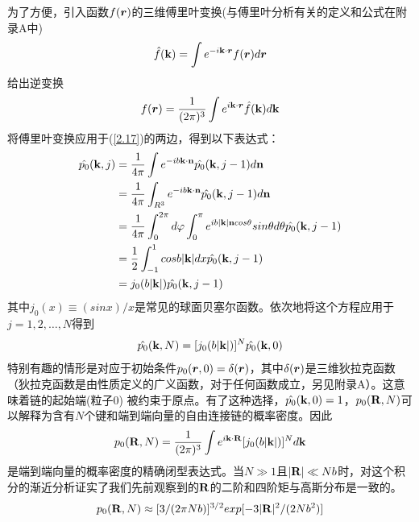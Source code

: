 为了方便，引入函数$f(\bm{r})$的三维傅里叶变换(与傅里叶分析有关的定义和公式在附录A中)\\
\begin{gather}
\hat{f}(\mathbf{k})=\int e^{-i\mathbf{k} \cdot \bm{r}}f(\bm{r})d\bm{r}
\label{2.18}
\end{gather}
给出逆变换\\
\begin{gather}
 f(\bm{r})=\frac{1}{(2 \pi)^3} \int e^{i\mathbf{k} \cdot \bm{r}} \hat{f}(\mathbf{k})d\mathbf{k}
\label{2.19}
\end{gather}
将傅里叶变换应用于(\ref{2.17})的两边，得到以下表达式：\\
\begin{gather}
\begin{aligned}
\hat{p_0}(\mathbf{k},j)&=\frac{1}{4 \pi} \int e^{-ib\mathbf{k} \cdot \mathbf{n}} \hat{p_0}(\mathbf{k},j-1)d\mathbf{n} \\&=\frac{1}{4 \pi} \int _{R^3}e^{-ib\mathbf{k} \cdot \mathbf{n}} \hat{p_0}(\mathbf{k},j-1)d\mathbf{n} \\&=
\frac{1}{4 \pi} \int _{0}^{2 \pi}d \varphi \int _{0}^{\pi} e^{ib|\mathbf{k}|\mathbf{n} cos \theta}sin \theta d \theta \hat{p_0}(\mathbf{k},j-1) \\&=\frac{1}{2} \int _{-1}^{1}cos b|\mathbf{k}|dx \hat{p_0}(\mathbf{k},j-1) \\&=j_0(b|\mathbf{k}|)\hat{p_0}(\mathbf{k},j-1)
\label{2.20}
\end{aligned}
\end{gather}
其中$j_0(x) \equiv (sinx)/x$是常见的球面贝塞尔函数。依次地将这个方程应用于$j=1,2,\ldots,N$得到\\
\begin{gather}
\hat{p_0}(\mathbf{k},N)=[j_0(b|\mathbf{k}|)]^{N}\hat{p_0}(\mathbf{k},0)
\label{2.21}
\end{gather}
特别有趣的情形是对应于初始条件$p_0(\bm{r},0)=\delta(\bm{r})$，其中$\delta(\bm{r})$是三维狄拉克函数（狄拉克函数是由性质定义的广义函数，对于任何函数成立，另见附录A）。这意味着链的起始端(粒子$0$) 被约束于原点。有了这种选择，$\hat{p_0}(\mathbf{k},0)=1$，$p_0(\mathbf{R},N)$可以解释为含有$N$个键和端到端向量的自由连接链的概率密度。因此\\
\begin{gather}
p_0(\mathbf{R},N)=\frac{1}{(2 \pi)^3 }\int e^{i\mathbf{k} \cdot \mathbf{R}}[j_0(b|\mathbf{k}|)]^{N}d\mathbf{k}
\label{2.22}
\end{gather}
是端到端向量的概率密度的精确闭型表达式。当$N\gg1$且$|\mathbf{R}| \ll Nb $时，对这个积分的渐近分析证实了我们先前观察到的$\mathbf{R}$的二阶和四阶矩与高斯分布是一致的。\\
\begin{gather}
p_0(\mathbf{R},N) \approx [3/(2 \pi Nb)]^{3/2}exp[-3|\mathbf{R}|^2/(2Nb^2)]
\label{2.23}
\end{gather}
